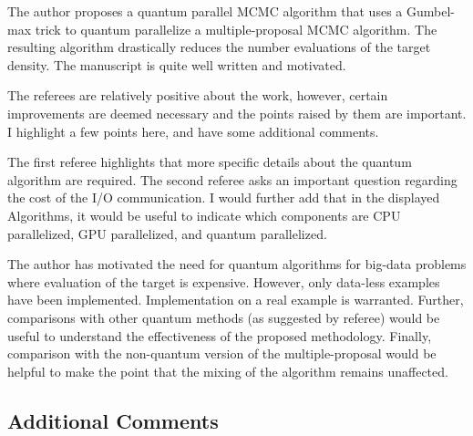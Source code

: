 \documentclass[12pt]{article}
\begin{document}
The author proposes a quantum parallel MCMC algorithm that uses a Gumbel-max trick to quantum parallelize a multiple-proposal MCMC algorithm. The resulting algorithm drastically reduces the number evaluations of the target density. The manuscript is quite well written and motivated.


The referees are relatively positive about the work, however, certain improvements are deemed necessary and the points raised by them are important. I highlight a few points here, and have some additional comments.


The first referee highlights that more specific details about the quantum algorithm are required. The second referee asks an important question regarding the cost of the I/O communication. I would further add that in the displayed Algorithms, it would be useful to indicate which components are CPU parallelized, GPU parallelized, and quantum parallelized.


The author has motivated the need for quantum algorithms for big-data problems where evaluation of the target is expensive. However, only data-less examples have been implemented. Implementation on a real example is warranted. Further, comparisons with other quantum methods (as suggested by referee) would be useful to understand the effectiveness of the proposed methodology. Finally, comparison with the non-quantum version of the multiple-proposal would be helpful to make the point that the mixing of the algorithm remains unaffected.

\subsection*{Additional Comments}
\end{document}
